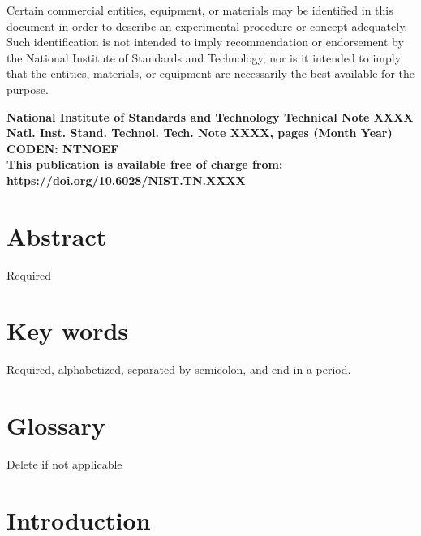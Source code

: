 \documentclass[
  12pt,
]{article}
\begin{document}
\begin{titlepage}
 
\begin{flushright}
\footnotesize  Certain commercial entities, equipment, or materials may be identified in this document in order to describe an experimental procedure or concept adequately. Such identification is not intended to imply recommendation or endorsement by the National Institute of Standards and Technology, nor is it intended to imply that the entities, materials, or equipment are necessarily the best available for the purpose.\\ 
\vfill
 
\normalsize \textbf{National Institute of Standards and Technology Technical Note XXXX\\ 
Natl. Inst. Stand. Technol. Tech. Note XXXX, \pageref{LastPage} pages (Month Year)} \\
\textbf{CODEN: NTNOEF}\\
\vspace{12pt}
\textbf{This publication is available free of charge from: https://doi.org/10.6028/NIST.TN.XXXX}
\vfill
\end{flushright}
\end{titlepage}

\section*{Abstract}

\normalsize Required

\section*{Key words}

\normalsize Required, alphabetized, separated by semicolon, and end in a
period. \pagebreak

\begin{center}
    \tableofcontents
    \listoftables
    \listoffigures
\end{center}
\pagebreak

\section*{Glossary}

Delete if not applicable \pagebreak

\section{Introduction}
\end{document}
